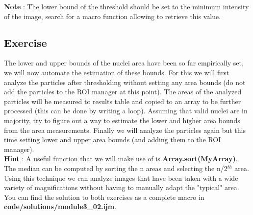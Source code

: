 \textbf{\underline{Note}} : The lower bound of the threshold should be set to the minimum intensity of the image, search for a macro function allowing to retrieve this value.

\subsection{Exercise }

The lower and upper bounds of the nuclei area have been so far empirically set, we will now automate the estimation of these bounds. For this we will first analyze the particles after thresholding without setting any area bounds (do not add the particles to the ROI manager at this point). The areas of the analyzed particles will be measured to results table and copied to an array to be further processed (this can be done by writing a loop). Assuming that valid nuclei are in majority, try to figure out a way to estimate the lower and higher area bounds from the area measurements. Finally we will analyze the particles again but this time setting lower and upper area bounds (and adding them to the ROI manager).\\

\textbf{\underline{Hint}} : A useful function that we will make use of is \textbf{Array.sort(MyArray)}. The median can be computed by sorting the n areas and selecting the n/2$^{th}$ area.\\

Using this technique we can analyze images that have been taken with a wide variety of magnifications without having to manually adapt the "typical" area. You can find the solution to both exercises as a complete macro in \textbf{code/solutions/module3\_02.ijm}.



